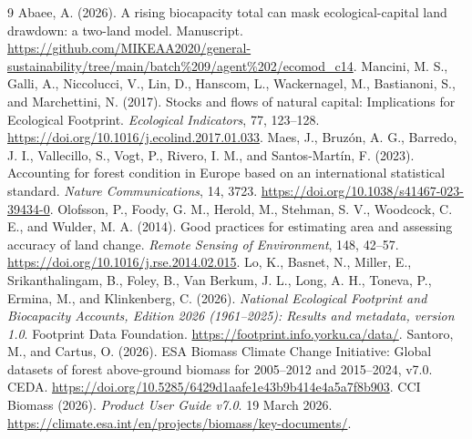 \documentclass[11pt,a4paper]{article}
\begin{document}
\begin{thebibliography}{9}
 Abaee, A. (2026). A rising biocapacity total can mask ecological-capital land drawdown: a two-land model. Manuscript. \url{https://github.com/MIKEAA2020/general-sustainability/tree/main/batch%209/agent%202/ecomod_c14}.
 Mancini, M. S., Galli, A., Niccolucci, V., Lin, D., Hanscom, L., Wackernagel, M., Bastianoni, S., and Marchettini, N. (2017). Stocks and flows of natural capital: Implications for Ecological Footprint. \emph{Ecological Indicators}, 77, 123--128. \url{https://doi.org/10.1016/j.ecolind.2017.01.033}.
 Maes, J., Bruz\'on, A. G., Barredo, J. I., Vallecillo, S., Vogt, P., Rivero, I. M., and Santos-Mart\'in, F. (2023). Accounting for forest condition in Europe based on an international statistical standard. \emph{Nature Communications}, 14, 3723. \url{https://doi.org/10.1038/s41467-023-39434-0}.
 Olofsson, P., Foody, G. M., Herold, M., Stehman, S. V., Woodcock, C. E., and Wulder, M. A. (2014). Good practices for estimating area and assessing accuracy of land change. \emph{Remote Sensing of Environment}, 148, 42--57. \url{https://doi.org/10.1016/j.rse.2014.02.015}.
 Lo, K., Basnet, N., Miller, E., Srikanthalingam, B., Foley, B., Van Berkum, J. L., Long, A. H., Toneva, P., Ermina, M., and Klinkenberg, C. (2026). \emph{National Ecological Footprint and Biocapacity Accounts, Edition 2026 (1961--2025): Results and metadata, version 1.0}. Footprint Data Foundation. \url{https://footprint.info.yorku.ca/data/}.
 Santoro, M., and Cartus, O. (2026). ESA Biomass Climate Change Initiative: Global datasets of forest above-ground biomass for 2005--2012 and 2015--2024, v7.0. CEDA. \url{https://doi.org/10.5285/6429d1aafe1e43b9b414e4a5a7f8b903}.
 CCI Biomass (2026). \emph{Product User Guide v7.0}. 19 March 2026. \url{https://climate.esa.int/en/projects/biomass/key-documents/}.
\end{thebibliography}
\end{document}
